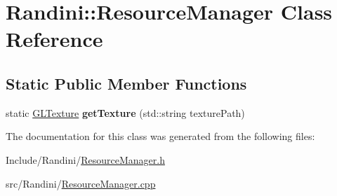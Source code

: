\hypertarget{classRandini_1_1ResourceManager}{
\section{Randini::ResourceManager Class Reference}
\label{classRandini_1_1ResourceManager}
}
\subsection*{Static Public Member Functions}
\begin{DoxyCompactItemize}
\item 
\hypertarget{classRandini_1_1ResourceManager_a9d7e62e883e8cdd3a7c73f5ebe9a271f}{
static \hyperlink{structRandini_1_1GLTexture}{GLTexture} {\bfseries getTexture} (std::string texturePath)}
\label{classRandini_1_1ResourceManager_a9d7e62e883e8cdd3a7c73f5ebe9a271f}

\end{DoxyCompactItemize}


The documentation for this class was generated from the following files:\begin{DoxyCompactItemize}
\item 
Include/Randini/\hyperlink{ResourceManager_8h}{ResourceManager.h}\item 
src/Randini/\hyperlink{ResourceManager_8cpp}{ResourceManager.cpp}\end{DoxyCompactItemize}
